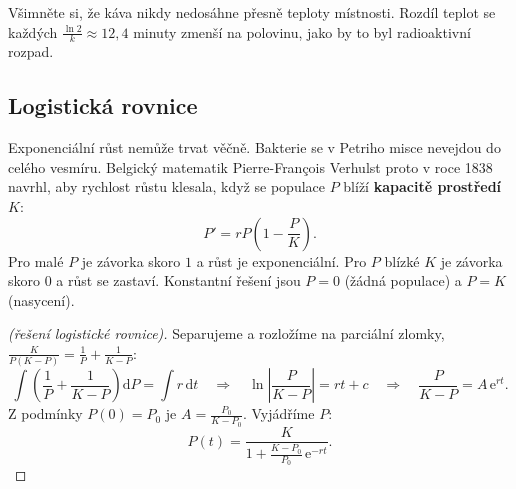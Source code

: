 Všimněte si, že káva nikdy nedosáhne přesně teploty místnosti. Rozdíl teplot se každých $\frac{\ln 2}{k}\approx 12{,}4$ minuty zmenší na polovinu, jako by to byl radioaktivní rozpad.

\subsection{Logistická rovnice}

Exponenciální růst nemůže trvat věčně. Bakterie se v Petriho misce nevejdou do celého vesmíru. Belgický matematik Pierre-François Verhulst proto v roce 1838 navrhl, aby rychlost růstu klesala, když se populace $P$ blíží \textbf{kapacitě prostředí} $K$:
\begin{equation*}
  P' = rP\left(1 - \frac{P}{K}\right).
\end{equation*}
Pro malé $P$ je závorka skoro $1$ a růst je exponenciální. Pro $P$ blízké $K$ je závorka skoro $0$ a růst se zastaví. Konstantní řešení jsou $P = 0$ (žádná populace) a $P = K$ (nasycení).

\begin{proof}[(řešení logistické rovnice)]
  Separujeme a rozložíme na parciální zlomky, $\frac{K}{P(K - P)} = \frac{1}{P} + \frac{1}{K - P}$:
  \begin{equation*}
    \int\left(\frac{1}{P} + \frac{1}{K - P}\right)\mathrm{d}P = \int r\,\mathrm{d}t\quad\Longrightarrow\quad\ln\left|\frac{P}{K - P}\right| = rt + c\quad\Longrightarrow\quad\frac{P}{K - P} = A\,\mathrm{e}^{rt}.
  \end{equation*}
  Z podmínky $P(0) = P_0$ je $A = \frac{P_0}{K - P_0}$. Vyjádříme $P$:
  \begin{equation*}
    P(t) = \frac{K}{1 + \frac{K - P_0}{P_0}\,\mathrm{e}^{-rt}}.
  \end{equation*}
\end{proof}

\begin{center}
\end{center}

